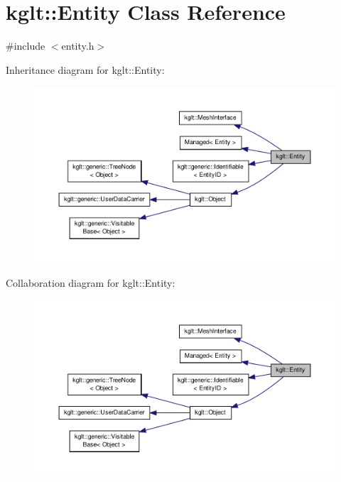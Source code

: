 \hypertarget{classkglt_1_1_entity}{\section{kglt\-:\-:Entity Class Reference}
\label{classkglt_1_1_entity}
}


{\ttfamily \#include $<$entity.\-h$>$}



Inheritance diagram for kglt\-:\-:Entity\-:\nopagebreak
\begin{figure}[H]
\begin{center}
\leavevmode
\includegraphics[width=350pt]{classkglt_1_1_entity__inherit__graph}
\end{center}
\end{figure}


Collaboration diagram for kglt\-:\-:Entity\-:\nopagebreak
\begin{figure}[H]
\begin{center}
\leavevmode
\includegraphics[width=350pt]{classkglt_1_1_entity__coll__graph}
\end{center}
\end{figure}
